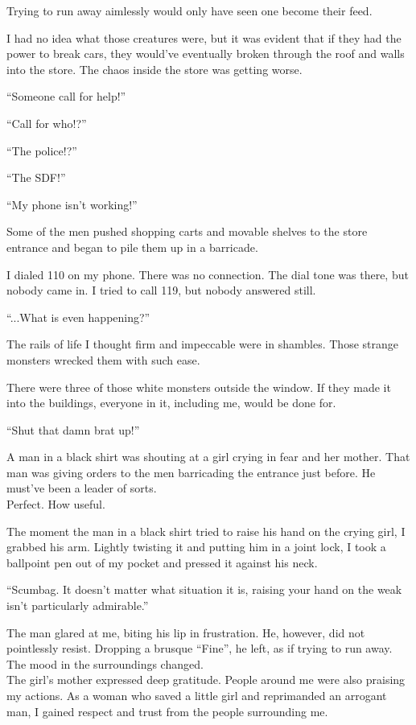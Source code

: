 Trying to run away aimlessly would only have seen one become their feed.

I had no idea what those creatures were, but it was evident that if they had the power to break cars, they would've eventually broken through the roof and walls into the store. The chaos inside the store was getting worse.

``Someone call for help!''

``Call for who!?''

``The police!?''

``The SDF!''

``My phone isn't working!''

Some of the men pushed shopping carts and movable shelves to the store entrance and began to pile them up in a barricade.

I dialed 110 on my phone. There was no connection. The dial tone was there, but nobody came in. I tried to call 119, but nobody answered still.

``...What is even happening?''

The rails of life I thought firm and impeccable were in shambles. Those strange monsters wrecked them with such ease.

There were three of those white monsters outside the window. If they made it into the buildings, everyone in it, including me, would be done for.

``Shut that damn brat up!''

A man in a black shirt was shouting at a girl crying in fear and her mother. That man was giving orders to the men barricading the entrance just before. He must've been a leader of sorts.\\
Perfect. How useful.

The moment the man in a black shirt tried to raise his hand on the crying girl, I grabbed his arm. Lightly twisting it and putting him in a joint lock, I took a ballpoint pen out of my pocket and pressed it against his neck.

``Scumbag. It doesn't matter what situation it is, raising your hand on the weak isn't particularly admirable.''

The man glared at me, biting his lip in frustration. He, however, did not pointlessly resist. Dropping a brusque ``Fine'', he left, as if trying to run away.\\
The mood in the surroundings changed.\\
The girl's mother expressed deep gratitude. People around me were also praising my actions. As a woman who saved a little girl and reprimanded an arrogant man, I gained respect and trust from the people surrounding me.

